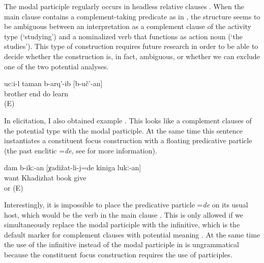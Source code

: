 The modal participle regularly occurs in headless relative clauses . When the main clause contains a complement-taking predicate as in , the structure seems to be ambiguous between an interpretation as a complement clause of the activity type (`studying') and a nominalized verb that functions as action noun (`the studies'). This type of construction requires future research in order to be able to decide whether the construction is, in fact, ambiguous, or whether we can exclude one of the two potential analyses.
 	
\begin{exe}	
	\ex	\label{ex:‎Brother finished to study / studying / the studies}
	\gll	ucːi-l	taman	b-arq'-ib	[b-uč'-an]\\
		brother	end	do	learn\\
	\glt	{} (E)
\end{exe}


In elicitation, I also obtained example . This looks like a complement clauses of the potential type with the modal participle. At the same time this sentence instantiates a constituent focus construction with a floating predicative particle (the past enclitic =\textit{de}, see  for more information). 

%
\begin{exe}
	\ex	\label{ex:‎I wanted to give the book to Khadizhat}
	\gll	dam	b-ikː-an	[χadižat-li-j=de	kiniga	lukː-an]\\
			want	Khadizhat	book	give\\
	\glt	{} or  (E)
	\end{exe}

Interestingly, it is impossible to place the predicative particle =\textit{de} on its usual host, which would be the verb in the main clause . This is only allowed if we simultaneously replace the modal participle with the infinitive, which is the default marker for complement clauses with potential meaning . At the same time the use of the infinitive instead of the modal participle in  is ungrammatical because the constituent focus construction requires the use of participles.


